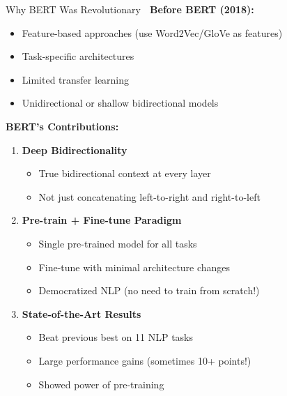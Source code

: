 \documentclass[aspectratio=169]{beamer}
\begin{document}
\begin{frame}[shrink=10]{Why BERT Was Revolutionary 🚀}
\textbf{Before BERT (2018):}
\begin{itemize}\setlength{\itemsep}{0pt}
    \item Feature-based approaches (use Word2Vec/GloVe as features)
    \item Task-specific architectures
    \item Limited transfer learning
    \item Unidirectional or shallow bidirectional models
\end{itemize}

\vspace{1em}

\textbf{BERT's Contributions:}
\begin{enumerate}\setlength{\itemsep}{0pt}
    \item \textbf{Deep Bidirectionality}
    \begin{itemize}\setlength{\itemsep}{0pt}
        \item True bidirectional context at every layer
        \item Not just concatenating left-to-right and right-to-left
    \end{itemize}

    \item \textbf{Pre-train + Fine-tune Paradigm}
    \begin{itemize}\setlength{\itemsep}{0pt}
        \item Single pre-trained model for all tasks
        \item Fine-tune with minimal architecture changes
        \item Democratized NLP (no need to train from scratch!)
    \end{itemize}

    \item \textbf{State-of-the-Art Results}
    \begin{itemize}\setlength{\itemsep}{0pt}
        \item Beat previous best on 11 NLP tasks
        \item Large performance gains (sometimes 10+ points!)
        \item Showed power of pre-training
    \end{itemize}
\end{enumerate}
\end{frame}
\end{document}
